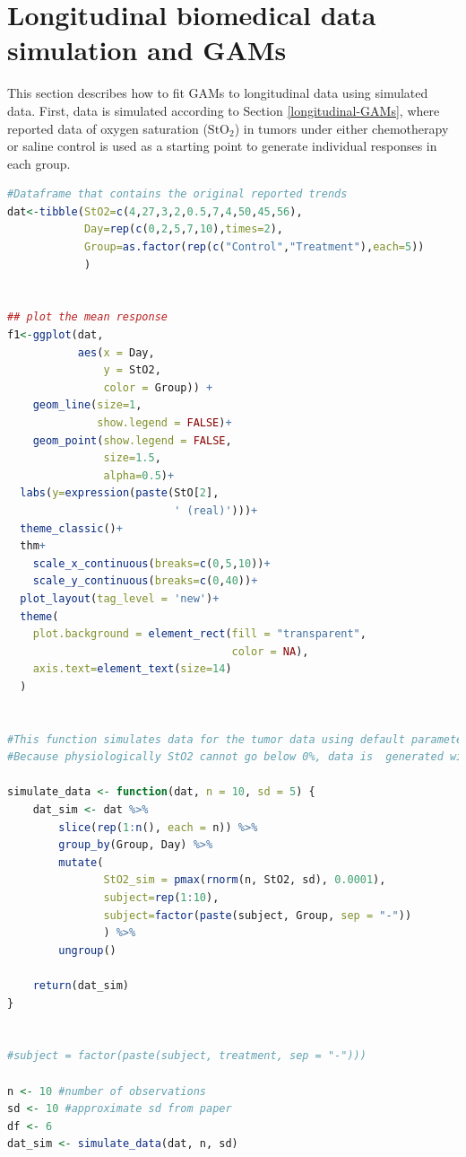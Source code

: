 \documentclass[
]{article}
\begin{document}
\hypertarget{tumor-data-simulation}{%
\section{Longitudinal biomedical data simulation and GAMs}\label{tumor-data-simulation}}

This section describes how to fit GAMs to longitudinal data using simulated data. First, data is simulated according to Section \ref{longitudinal-GAMs}, where reported data of oxygen saturation (\(\mbox{StO}_2\)) in tumors under either chemotherapy or saline control is used as a starting point to generate individual responses in each group.

\begin{lstlisting}[language=R]
#Dataframe that contains the original reported trends
dat<-tibble(StO2=c(4,27,3,2,0.5,7,4,50,45,56),
            Day=rep(c(0,2,5,7,10),times=2),
            Group=as.factor(rep(c("Control","Treatment"),each=5))
            )


## plot the mean response
f1<-ggplot(dat, 
           aes(x = Day, 
               y = StO2, 
               color = Group)) +
    geom_line(size=1,
              show.legend = FALSE)+
    geom_point(show.legend = FALSE,
               size=1.5,
               alpha=0.5)+
  labs(y=expression(paste(StO[2],
                          ' (real)')))+
  theme_classic()+
  thm+
    scale_x_continuous(breaks=c(0,5,10))+
    scale_y_continuous(breaks=c(0,40))+
  plot_layout(tag_level = 'new')+
  theme(
    plot.background = element_rect(fill = "transparent", 
                                   color = NA),
    axis.text=element_text(size=14)
  )


#This function simulates data for the tumor data using default parameters of 10 observations per time point,and Standard deviation (sd) of 5%.
#Because physiologically StO2 cannot go below 0%, data is  generated with a cutoff value of 0.0001 (the "StO2_sim")

simulate_data <- function(dat, n = 10, sd = 5) {
    dat_sim <- dat %>%
        slice(rep(1:n(), each = n)) %>%
        group_by(Group, Day) %>%
        mutate(
               StO2_sim = pmax(rnorm(n, StO2, sd), 0.0001),
               subject=rep(1:10),
               subject=factor(paste(subject, Group, sep = "-"))
               ) %>%
        ungroup()

    return(dat_sim)
}


#subject = factor(paste(subject, treatment, sep = "-")))

n <- 10 #number of observations
sd <- 10 #approximate sd from paper
df <- 6
dat_sim <- simulate_data(dat, n, sd)


\end{lstlisting}
\end{document}
